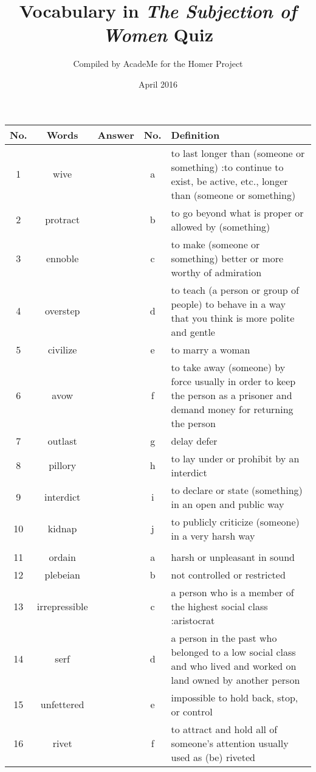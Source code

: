 \documentclass[a4paper]{article}
\title{Vocabulary in \textit{The Subjection of Women} Quiz}
\author{Compiled by AcadeMe for the Homer Project}
\date{April 2016}
\begin{document}
\maketitle
\begin{center}
\begin{tabular}{|c|c|c|c|m{}|}
\hline
No. & Words & Answer & No. & Definition \\
\hline
 1 & wive & & a &  to last longer than (someone or something) :to continue to exist, be active, etc., longer than (someone or something) \\
\hline
 2 & protract & & b &  to go beyond what is proper or allowed by (something) \\
\hline
 3 & ennoble & & c &  to make (someone or something) better or more worthy of admiration \\
\hline
 4 & overstep & & d &  to teach (a person or group of people) to behave in a way that you think is more polite and gentle \\
\hline
 5 & civilize & & e &  to marry a woman\\
\hline
 6 & avow & & f &  to take away (someone) by force usually in order to keep the person as a prisoner and demand money for returning the person \\
\hline
 7 & outlast & & g &  delay defer\\
\hline
 8 & pillory & & h &  to lay under or prohibit by an interdict\\
\hline
 9 & interdict & & i &  to declare or state (something) in an open and public way \\
\hline
 10 & kidnap & & j &  to publicly criticize (someone) in a very harsh way \\
\hline
 & & & & \\
\hline
 11 & ordain & & a &  harsh or unpleasant in sound \\
\hline
 12 & plebeian & & b &  not controlled or restricted \\
\hline
 13 & irrepressible & & c &  a person who is a member of the highest social class :aristocrat\\
\hline
 14 & serf & & d &  a person in the past who belonged to a low social class and who lived and worked on land owned by another person \\
\hline
 15 & unfettered & & e &  impossible to hold back, stop, or control \\
\hline
 16 & rivet & & f &  to attract and hold all of someone's attention usually used as (be) riveted \\

\end{tabular}
\end{center}
\end{document}

